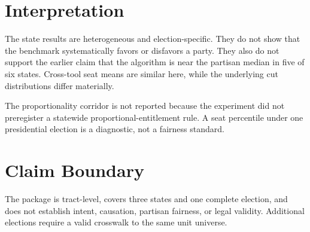 \section{Interpretation}

The state results are heterogeneous and election-specific. They do not show
that the benchmark systematically favors or disfavors a party. They also do
not support the earlier claim that the algorithm is near the partisan median
in five of six states. Cross-tool seat means are similar here, while the
underlying cut distributions differ materially.

The proportionality corridor is not reported because the experiment did not
preregister a statewide proportional-entitlement rule. A seat percentile under
one presidential election is a diagnostic, not a fairness standard.

\section{Claim Boundary}

The package is tract-level, covers three states and one complete election, and
does not establish intent, causation, partisan fairness, or legal validity.
Additional elections require a valid crosswalk to the same unit universe.
